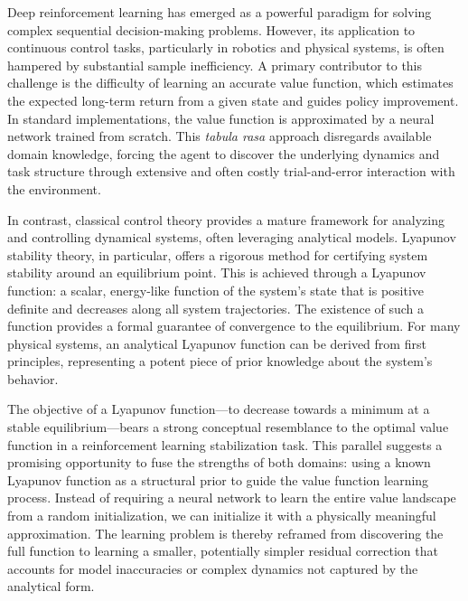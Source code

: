 \documentclass[]{article}
\begin{document}
Deep reinforcement learning has emerged as a powerful paradigm for solving complex sequential decision-making problems. However, its application to continuous control tasks, particularly in robotics and physical systems, is often hampered by substantial sample inefficiency. A primary contributor to this challenge is the difficulty of learning an accurate value function, which estimates the expected long-term return from a given state and guides policy improvement. In standard implementations, the value function is approximated by a neural network trained from scratch. This \textit{tabula rasa} approach disregards available domain knowledge, forcing the agent to discover the underlying dynamics and task structure through extensive and often costly trial-and-error interaction with the environment.

In contrast, classical control theory provides a mature framework for analyzing and controlling dynamical systems, often leveraging analytical models. Lyapunov stability theory, in particular, offers a rigorous method for certifying system stability around an equilibrium point. This is achieved through a Lyapunov function: a scalar, energy-like function of the system's state that is positive definite and decreases along all system trajectories. The existence of such a function provides a formal guarantee of convergence to the equilibrium. For many physical systems, an analytical Lyapunov function can be derived from first principles, representing a potent piece of prior knowledge about the system's behavior.

The objective of a Lyapunov function—to decrease towards a minimum at a stable equilibrium—bears a strong conceptual resemblance to the optimal value function in a reinforcement learning stabilization task. This parallel suggests a promising opportunity to fuse the strengths of both domains: using a known Lyapunov function as a structural prior to guide the value function learning process. Instead of requiring a neural network to learn the entire value landscape from a random initialization, we can initialize it with a physically meaningful approximation. The learning problem is thereby reframed from discovering the full function to learning a smaller, potentially simpler residual correction that accounts for model inaccuracies or complex dynamics not captured by the analytical form.
\end{document}
